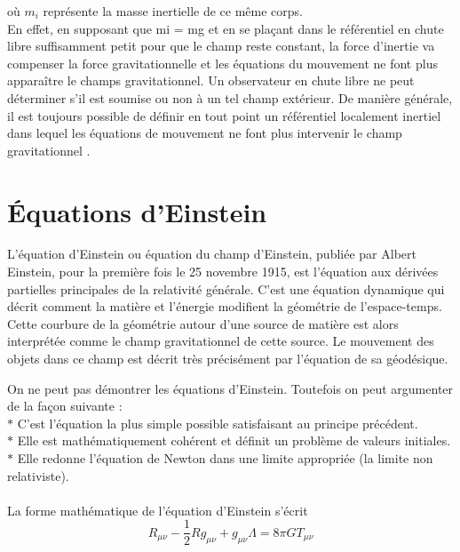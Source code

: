 \documentclass[12pt,  a4paper, openright]{report} %
\begin{document}
	où $m_{i}$ représente la masse inertielle de ce même corps.\\
	En effet, en supposant que mi = mg et en se plaçant dans le référentiel en chute libre
	suffisamment petit pour que le champ reste constant, la force d'inertie va compenser la force
	gravitationnelle et les équations du mouvement ne font plus apparaître le champs gravitationnel.
	Un observateur en chute libre ne peut déterminer s'il est soumise ou non à un tel champ
	extérieur. De manière générale, il est toujours possible de définir en tout point un référentiel
	localement inertiel dans lequel les équations de mouvement ne font plus intervenir le champ
	gravitationnel \cite{6}.
	\section{Équations d’Einstein}
	L’équation d'Einstein ou équation du champ d'Einstein, publiée par Albert Einstein, pour la première fois le 25 novembre 1915, est l'équation aux dérivées partielles principales de la relativité générale. C'est une équation dynamique qui décrit comment la matière et l'énergie modifient la géométrie de l'espace-temps. Cette courbure de la géométrie autour d'une source de matière est alors interprétée comme le champ gravitationnel de cette source. Le mouvement des objets dans ce champ est décrit très précisément par l'équation de sa géodésique.
	
	On ne peut pas démontrer les équations d’Einstein. Toutefois on peut argumenter de la
	façon suivante :\\
	$\ast$ C’est l’équation la plus simple possible satisfaisant au principe précédent.\\
	$\ast$ Elle est mathématiquement cohérent et définit un problème de valeurs initiales.\\
	$\ast$ Elle redonne l’équation de Newton dans une limite appropriée (la limite non relativiste).\\
	\\
	La forme mathématique de l’équation d’Einstein s’écrit \cite{7}
	\begin{equation}
	R_{\mu\nu}-\dfrac{1}{2}Rg_{\mu\nu}+g_{\mu\nu}\Lambda=8\pi GT_{\mu\nu}
	\end{equation}
	
\end{document}
